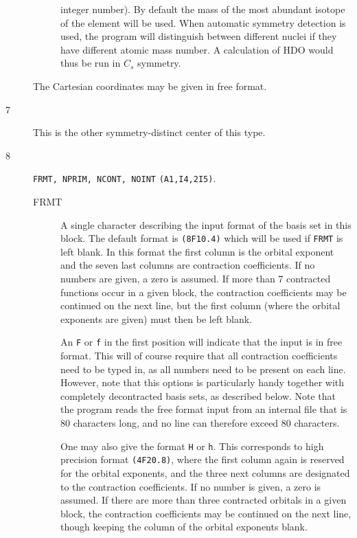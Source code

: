 \begin{description}
\begin{description}
  integer number). By default the mass of the most abundant isotope
  of the element will be used. When automatic symmetry detection is
  used, the program will distinguish between different nuclei if they
  have different atomic mass number. A calculation of HDO would thus
  be run in $C_s$ symmetry. 
\end{description}
The Cartesian coordinates may
be given in free format.
\item[7] This is the other symmetry-distinct center of this type.
\item[8] \verb|FRMT, NPRIM, NCONT, NOINT| {\tt (A1,I4,2I5)}.
\begin{description}
\item[FRMT] A single character describing the input format of the
basis set in this block. The default format is {\tt (8F10.4)} which
will be used if {\tt FRMT} is left blank. In this format
the first column is the orbital exponent and the seven last columns
are contraction coefficients. If no numbers are given, a zero is
assumed. If more than 7 contracted functions occur in a given block,
the contraction coefficients may be continued on the next line, but
the first column (where the orbital exponents are given) must then be
left blank.

An {\tt F} or {\tt f} in the first position will indicate that the
input is in free format. This will of course require that all
contraction coefficients need to be typed in, as all numbers need
to be present on each line. However, note that this options is
particularly handy together with completely decontracted basis
sets, as described below. Note that the program reads the free
format input from an internal file that is 80 characters long, and
no line can therefore exceed 80 characters.

One may also give the format {\tt H} or {\tt h}. This corresponds to
high precision format {\tt (4F20.8)}, where the first column again is
reserved for the orbital exponents, and the three next columns are
designated to the contraction coefficients. If no number is given, a zero
is assumed. If there are more than three contracted orbitals in a
given block, the contraction coefficients may be continued on the next
line, though keeping the column of the orbital exponents blank.


\end{description}
\end{description}
